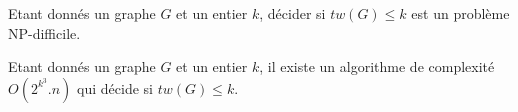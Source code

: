 
	Etant donnés un graphe $G$ et un entier $k$, décider
	si $tw(G) \leq k$ est un problème NP-difficile.

	Etant donnés un graphe $G$ et un entier $k$, 
	il existe un algorithme de complexité $O(2^{k^3}.n)$
	qui décide si $tw(G) \leq k$.


